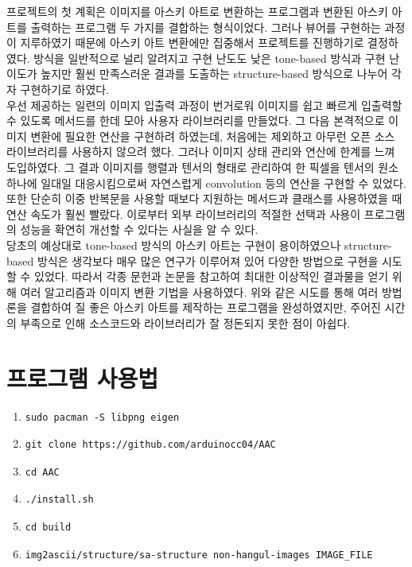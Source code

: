 \documentclass[conference]{IEEEtran}
\begin{document}
프로젝트의 첫 계획은 이미지를 아스키 아트로 변환하는 프로그램과 변환된 아스키 아트를 출력하는 프로그램 두 가지를 결합하는 형식이었다.
그러나  뷰어를 구현하는 과정이 지루하였기 때문에 아스키 아트 변환에만 집중해서 프로젝트를 진행하기로 결정하였다.
방식을 일반적으로 널리 알려지고 구현 난도도 낮은 tone-based 방식과 구현 난이도가 높지만 훨씬 만족스러운 결과를 도출하는 structure-based 방식으로 나누어 각자 구현하기로 하였다. \\
\indent 우선  제공하는 일련의 이미지 입출력 과정이 번거로워 이미지를 쉽고 빠르게 입출력할 수 있도록  메서드를 한데 모아 사용자 라이브러리를 만들었다.
그 다음 본격적으로 이미지 변환에 필요한 연산을 구현하려 하였는데, 처음에는  제외하고 아무런 오픈 소스 라이브러리를 사용하지 않으려 했다.
그러나  이미지 상태 관리와 연산에 한계를 느껴  도입하였다.
그 결과 이미지를 행렬과 텐서의 형태로 관리하여 한 픽셀을 텐서의 원소 하나에 일대일 대응시킴으로써 자연스럽게 convolution 등의 연산을 구현할 수 있었다.
또한 단순히 이중 반복문을 사용할 때보다  지원하는 메서드과 클래스를 사용하였을 때 연산 속도가 훨씬 빨랐다.
이로부터 외부 라이브러리의 적절한 선택과 사용이 프로그램의 성능을 확연히 개선할 수 있다는 사실을 알 수 있다. \\
\indent 당초의 예상대로 tone-based 방식의 아스키 아트는 구현이 용이하였으나 structure-based 방식은 생각보다 매우 많은 연구가 이루어져 있어 다양한 방법으로 구현을 시도할 수 있었다.
따라서 각종 문헌과 논문을 참고하여 최대한 이상적인 결과물을 얻기 위해 여러 알고리즘과 이미지 변환 기법을 사용하였다.
위와 같은 시도를 통해 여러 방법론을 결합하여 질 좋은 아스키 아트를 제작하는 프로그램을 완성하였지만, 주어진 시간의 부족으로 인해 소스코드와 라이브러리가 잘 정돈되지 못한 점이 아쉽다.

\section{프로그램 사용법}
\begin{enumerate}
\item \begin{verbatim}sudo pacman -S libpng eigen\end{verbatim}
\item \begin{verbatim}git clone https://github.com/arduinocc04/AAC\end{verbatim}
\item \begin{verbatim}cd AAC\end{verbatim}
\item \begin{verbatim}./install.sh\end{verbatim}
\item \begin{verbatim}cd build \end{verbatim}
\item \begin{verbatim}img2ascii/structure/sa-structure non-hangul-images IMAGE_FILE\end{verbatim}
\end{enumerate}



\end{document}
